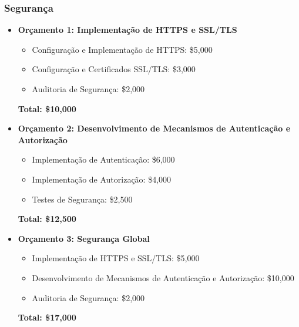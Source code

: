 	\subsubsection{Segurança}
	\begin{itemize}
		\item \textbf{Orçamento 1: Implementação de HTTPS e SSL/TLS}
		\begin{itemize}
			\item Configuração e Implementação de HTTPS: \$5,000
			\item Configuração e Certificados SSL/TLS: \$3,000
			\item Auditoria de Segurança: \$2,000
		\end{itemize}
		
		\textbf{Total: \$10,000}
		
		\item \textbf{Orçamento 2: Desenvolvimento de Mecanismos de Autenticação e Autorização}
		\begin{itemize}
			\item Implementação de Autenticação: \$6,000
			\item Implementação de Autorização: \$4,000
			\item Testes de Segurança: \$2,500
		\end{itemize}
		
		\textbf{Total: \$12,500}
		
		\item \textbf{Orçamento 3: Segurança Global}
		\begin{itemize}
			\item Implementação de HTTPS e SSL/TLS: \$5,000
			\item Desenvolvimento de Mecanismos de Autenticação e Autorização: \$10,000
			\item Auditoria de Segurança: \$2,000
		\end{itemize}
		
		\textbf{Total: \$17,000}
	\end{itemize}
	
